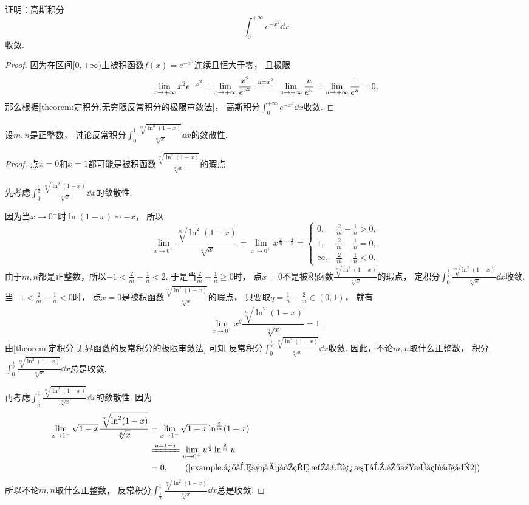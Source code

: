\begin{example}\label{example:定积分.高斯积分的收敛性}
证明：高斯积分\[
	\int_0^{+\infty} e^{-x^2} \dd{x}
\]收敛.
\begin{proof}
因为在区间\([0,+\infty)\)上被积函数\(f(x) = e^{-x^2}\)连续且恒大于零，
且极限\[
	\lim_{x\to+\infty} x^2 e^{-x^2}
	= \lim_{x\to+\infty} \frac{x^2}{e^{x^2}}
	\xlongequal{u=x^2} \lim_{u\to+\infty} \frac{u}{e^u}
	= \lim_{u\to+\infty} \frac{1}{e^u}
	= 0,
\]
那么根据\cref{theorem:定积分.无穷限反常积分的极限审敛法}，
高斯积分\(\int_0^{+\infty} e^{-x^2} \dd{x}\)收敛.
\end{proof}
\end{example}

\begin{example}
设\(m,n\)是正整数，
讨论反常积分\(\int_0^1 \frac{\sqrt[m]{\ln^2(1-x)}}{\sqrt[n]{x}} \dd{x}\)的敛散性.
\begin{proof}
点\(x=0\)和\(x=1\)都可能是被积函数\(\frac{\sqrt[m]{\ln^2(1-x)}}{\sqrt[n]{x}}\)的瑕点.

先考虑\(\int_0^{\frac12} \frac{\sqrt[m]{\ln^2(1-x)}}{\sqrt[n]{x}} \dd{x}\)的敛散性.

因为当\(x\to0^+\)时\(\ln(1-x) \sim -x\)，
所以\[
	\lim_{x\to0^+} \frac{\sqrt[m]{\ln^2(1-x)}}{\sqrt[n]{x}}
	= \lim_{x\to0^+} x^{\frac2m-\frac1n}
	= \left\{ \begin{array}{cl}
		0, & \frac2m-\frac1n>0, \\
		1, & \frac2m-\frac1n=0, \\
		\infty, & \frac2m-\frac1n<0.
	\end{array} \right.
\]
由于\(m,n\)都是正整数，所以\(-1<\frac2m-\frac1n<2\).
于是当\(\frac2m-\frac1n\geq0\)时，
点\(x=0\)不是被积函数\(\frac{\sqrt[m]{\ln^2(1-x)}}{\sqrt[n]{x}}\)的瑕点，
定积分\(\int_0^{\frac12} \frac{\sqrt[m]{\ln^2(1-x)}}{\sqrt[n]{x}} \dd{x}\)收敛.
当\(-1<\frac2m-\frac1n<0\)时，
点\(x=0\)是被积函数\(\frac{\sqrt[m]{\ln^2(1-x)}}{\sqrt[n]{x}}\)的瑕点，
只要取\(q=\frac1n-\frac2m\in(0,1)\)，
就有\[
	\lim_{x\to0^+} x^q \frac{\sqrt[m]{\ln^2(1-x)}}{\sqrt[n]{x}} = 1.
\]
由\cref{theorem:定积分.无界函数的反常积分的极限审敛法} 可知
反常积分\(\int_0^{\frac12} \frac{\sqrt[m]{\ln^2(1-x)}}{\sqrt[n]{x}} \dd{x}\)收敛.
因此，不论\(m,n\)取什么正整数，
积分\(\int_0^{\frac12} \frac{\sqrt[m]{\ln^2(1-x)}}{\sqrt[n]{x}} \dd{x}\)总是收敛.

再考虑\(\int_{\frac12}^1 \frac{\sqrt[m]{\ln^2(1-x)}}{\sqrt[n]{x}} \dd{x}\)的敛散性.
因为\begin{align*}
	\lim_{x\to1^-} \sqrt{1-x} \frac{\sqrt[m]{\ln^2(1-x)}}{\sqrt[n]{x}}
	&= \lim_{x\to1^-} \sqrt{1-x} \ln^{\frac2m}(1-x) \\
	&\xlongequal{u=1-x}
	\lim_{u\to0^+} u^{\frac12} \ln^{\frac2m} u \\
	&= 0, \tag{\cref{example:微分中值定理.洛必达法则.零乘无穷大型2}}
\end{align*}
所以不论\(m,n\)取什么正整数，
反常积分\(\int_{\frac12}^1 \frac{\sqrt[m]{\ln^2(1-x)}}{\sqrt[n]{x}} \dd{x}\)总是收敛.
\end{proof}
\end{example}

